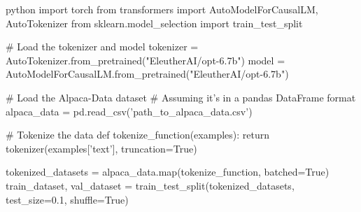 python
import torch
from transformers import AutoModelForCausalLM, AutoTokenizer
from sklearn.model_selection import train_test_split

# Load the tokenizer and model
tokenizer = AutoTokenizer.from_pretrained("EleutherAI/opt-6.7b")
model = AutoModelForCausalLM.from_pretrained("EleutherAI/opt-6.7b")

# Load the Alpaca-Data dataset
# Assuming it's in a pandas DataFrame format
alpaca_data = pd.read_csv('path_to_alpaca_data.csv')

# Tokenize the data
def tokenize_function(examples):
    return tokenizer(examples['text'], truncation=True)

tokenized_datasets = alpaca_data.map(tokenize_function, batched=True)
train_dataset, val_dataset = train_test_split(tokenized_datasets, test_size=0.1, shuffle=True)
